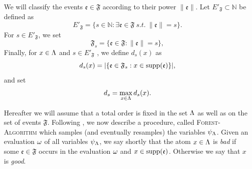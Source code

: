 \documentclass[11pt]{article}
\let\\=\noindent
\def\ee{\end{equation}}
\def\be{\begin{equation}}
\let\\=\noindent
\def\ee{\end{equation}}
\def\be{\begin{equation}}
\def\obj{{\rm supp}}
\def\ev{{\mathfrak{e}}}
\def\FF{{\mathfrak{F}}}
\def\0{\emptyset}
\begin{document}
\\We will classify the events $\ev \in \FF$ according to their power  $\|\ev\|$. Let  ${{E'_\FF}}\subset\mathbb{N}$  be defined  as
\be\label{E'}
E'_{\FF}=\{s \in \mathbb{N}: \exists \ev\in  \FF ~s.t. ~\|\ev\|=s\}.
\ee
For  $s\in E'_\FF$, we set
\begin{equation}\label{s}
  \FF_s=\{\ev\in \FF: \|\ev\|=s\},
\end{equation}
Finally, for  $x\in \Lambda$ and $s\in E'_{\FF}$ , we define $d_s(x)$ as %
\begin{equation}
  d_s(x)=|\{\ev\in \FF_s: x\in\obj(\ev)\}|,
\end{equation}
and set
\begin{equation}
  d_s=\max_{x\in \Lambda} {d_s(x)}.
\end{equation}
\def\0{\emptyset}
\noindent

\\Hereafter we will assume that  a total order is fixed in the set $\Lambda$ as well as on the set of events $\FF$. %
\\Following \cite{GKPT},  we now describe a procedure, called \textsc{Forest-Algorithm} which  samples (and eventually resamples) the variables  $\psi_\Lambda$. %
Given an evaluation $\omega$ of all variables $\psi_\Lambda$, we say shortly that the atom $x\in \Lambda$ is {\it bad} if  some $\ev\in \FF$ occurs in the evaluation $\omega$ and $x\in \obj(\ev)$. Otherwise we say that $x$ is {\it good}.
\end{document}
